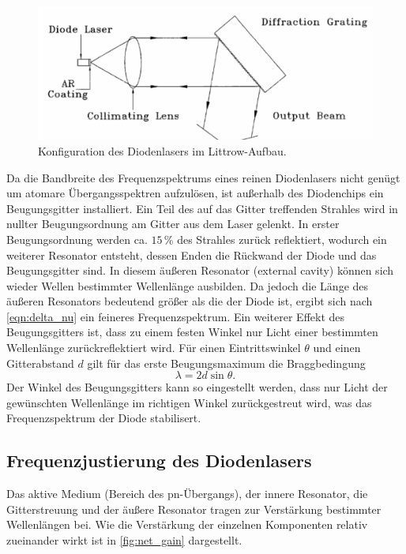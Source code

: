 \begin{figure}
    \centering
    \includegraphics[scale=0.4]{content/pics/aufbau_laser.png}
    \caption{Konfiguration des Diodenlasers im Littrow-Aufbau. \cite{diode_laser_spectroscopy}}
    \label{fig:aufbau}
\end{figure}

Da die Bandbreite des Frequenzspektrums eines reinen Diodenlasers nicht genügt um atomare Übergangsspektren aufzulösen, ist außerhalb des Diodenchips ein Beugungsgitter installiert. 
Ein Teil des auf das Gitter treffenden Strahles wird in nullter Beugungsordnung am Gitter aus dem Laser gelenkt. In erster Beugungsordnung werden ca. $15\,\%$ 
des Strahles zurück reflektiert, wodurch ein weiterer Resonator entsteht, dessen Enden die Rückwand der Diode und das Beugungsgitter sind. In diesem äußeren Resonator 
(external cavity) können sich wieder Wellen bestimmter Wellenlänge ausbilden. Da jedoch die Länge des äußeren Resonators bedeutend größer als die der Diode ist, ergibt 
sich nach \autoref{eqn:delta_nu} ein feineres Frequenzspektrum. Ein weiterer Effekt des Beugungsgitters ist, dass zu einem festen Winkel nur Licht einer bestimmten
Wellenlänge zurückreflektiert wird. Für einen Eintrittswinkel $\theta$ und einen Gitterabstand $d$ gilt für das erste Beugungsmaximum die Braggbedingung 
\begin{equation}
    \label{eqn:Bragg}
    \lambda = 2d \sin\theta.
\end{equation}
Der Winkel des Beugungsgitters kann so eingestellt werden, dass nur Licht der gewünschten Wellenlänge im richtigen Winkel zurückgestreut wird, was das Frequenzspektrum der 
Diode stabilisert. 

\subsection{Frequenzjustierung des Diodenlasers}
Das aktive Medium (Bereich des pn-Übergangs), der innere Resonator, die Gitterstreuung und der äußere Resonator tragen zur Verstärkung bestimmter Wellenlängen 
bei. Wie die Verstärkung der einzelnen Komponenten relativ zueinander wirkt ist in \autoref{fig:net_gain} dargestellt.

